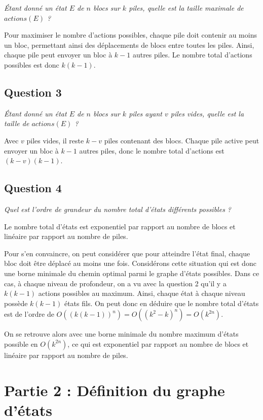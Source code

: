 \textit{Étant donné un état $E$ de $n$ blocs sur $k$ piles, quelle est la taille maximale de $actions(E)$ ?}

Pour maximiser le nombre d'actions possibles, chaque pile doit contenir au moins un bloc, permettant ainsi des déplacements de blocs entre toutes les piles. Ainsi, chaque pile peut envoyer un bloc à $k - 1$ autres piles. Le nombre total d'actions possibles est donc $k(k - 1)$.

\subsection{Question 3}

\textit{Étant donné un état $E$ de $n$ blocs sur $k$ piles ayant $v$ piles vides, quelle est la taille de $actions(E)$ ?}

Avec $v$ piles vides, il reste $k - v$ piles contenant des blocs. Chaque pile active peut envoyer un bloc à $k - 1$ autres piles, donc le nombre total d'actions est $(k-v)(k-1)$.

\subsection{Question 4}\label{q:4}

\textit{Quel est l'ordre de grandeur du nombre total d'états différents possibles ?}

Le nombre total d'états est exponentiel par rapport au nombre de blocs et linéaire par rapport au nombre de piles. 

Pour s'en convaincre, on peut considérer que pour atteindre l'état final, chaque bloc doit être déplacé au moins une fois. Considérons cette situation qui est donc une borne minimale du chemin optimal parmi le graphe d'états possibles. Dans ce cas, à chaque niveau de profondeur, on a vu avec la question 2 qu'il y a $k(k - 1)$ actions possibles au maximum. Ainsi, chaque état à chaque niveau possède $k(k - 1)$ états fils. On peut donc en déduire que le nombre total d'états est de l'ordre de $O((k(k - 1))^n) = O((k^2 - k)^n) = O(k^{2n})$.

On se retrouve alors avec une borne minimale du nombre maximum d'états possible en $O(k^{2n})$, ce qui est exponentiel par rapport au nombre de blocs et linéaire par rapport au nombre de piles.

\section{Partie 2 : Définition du graphe d'états}


